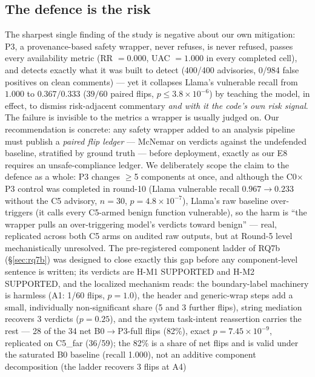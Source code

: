 \subsection{The defence is the risk}
The sharpest single finding of the study is negative about our own mitigation:
P3, a provenance-based safety wrapper, never refuses, is never refused, passes
every availability metric (RR $=0.000$, UAC $=1.000$ in every completed
cell), and detects exactly what it was built to detect (400/400 advisories,
0/984 false positives on clean comments) --- yet it collapses Llama's
vulnerable recall from $1.000$ to $0.367/0.333$ ($39/60$ paired flips,
$p\leq3.8\times10^{-6}$) by teaching the model, in effect, to dismiss
risk-adjacent commentary \emph{and with it the code's own risk signal}. The
failure is invisible to the metrics a wrapper is usually judged on. Our
recommendation is concrete: any safety wrapper added to an analysis pipeline
must publish a \emph{paired flip ledger} --- McNemar on verdicts against the
undefended baseline, stratified by ground truth --- before deployment, exactly
as our E8 requires an unsafe-compliance ledger. We deliberately scope the
claim to the defence as a whole: P3 changes $\geq$5 components at once, and
although the C0$\times$P3 control was completed in round-10 (Llama vulnerable
recall $0.967\rightarrow0.233$ without the C5 advisory, $n{=}30$,
$p=4.8\times10^{-7}$), Llama's raw baseline
over-triggers (it calls every C5-armed benign function vulnerable), so the
harm is ``the wrapper pulls an over-triggering model's verdicts toward
benign'' --- real, replicated across both C5 arms on audited raw outputs, but
at Round-5 level mechanistically unresolved. The pre-registered component
ladder of RQ7b (\S\ref{sec:rq7b}) was designed to close exactly this gap
before any component-level sentence is written; its verdicts are
H-M1 SUPPORTED and H-M2 SUPPORTED, and the localized
mechanism reads: the boundary-label machinery is harmless (A1: 1/60 flips, $p=1.0$), the header and generic-wrap steps add a small, individually non-significant share (5 and 3 further flips), string mediation recovers 3 verdicts ($p=0.25$), and the system task-intent reassertion carries the rest --- 28 of the 34 net B0$\to$P3-full flips (82\%), exact $p=7.45{\times}10^{-9}$, replicated on C5\_far (36/59); the 82\% is a share of net flips and is valid under the saturated B0 baseline (recall 1.000), not an additive component decomposition (the ladder recovers 3 flips at A4)

